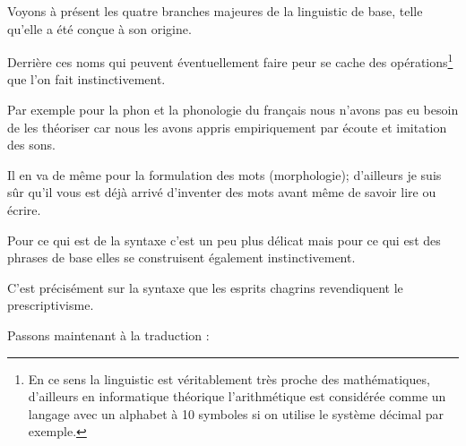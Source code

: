 Voyons à présent les quatre branches majeures de la \gls{linguistic} de
base, telle qu'elle a été conçue à son origine.

\begin{center}
\begin{mdframed}[style=citestyle, frametitle={Extrait de~\cite{Burleigh}}]
\end{mdframed}  
\end{center}

Derrière ces noms qui peuvent éventuellement faire peur se cache des
opérations\footnote{En ce sens la \gls{linguistic} est véritablement très
  proche des mathématiques, d'ailleurs en informatique théorique
  l'arithmétique est considérée comme un langage avec un alphabet à 10
symboles si on utilise le système décimal par exemple.} que l'on fait
instinctivement.

Par exemple pour la \gls{phon} et la phonologie du français nous
n'avons pas eu besoin de les théoriser car nous les avons appris
empiriquement par écoute et imitation des sons.

Il en va de même pour la formulation des mots (morphologie); d'ailleurs je suis sûr
qu'il vous est déjà arrivé d'inventer des mots avant même de savoir
lire ou écrire.

Pour ce qui est de la syntaxe c'est un peu plus délicat mais pour ce
qui est des phrases de base elles se construisent également
instinctivement.

C'est précisément sur la syntaxe que les esprits chagrins revendiquent le prescriptivisme.


Passons maintenant à la traduction :

